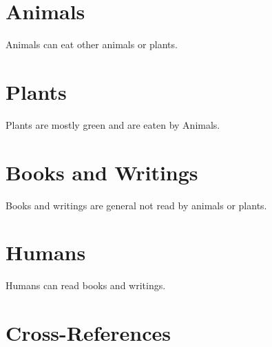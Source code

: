 \documentclass{article}
\begin{document}
\section{Animals}
Animals can eat other animals or plants.

\section{Plants}
Plants are mostly green and are eaten by Animals.

\section{Books and Writings}
Books and writings are general not read by animals or plants.

\section{Humans}
Humans can read books and writings.
\newpage
\section{Cross-References}
\crossreferences
\end{document}
